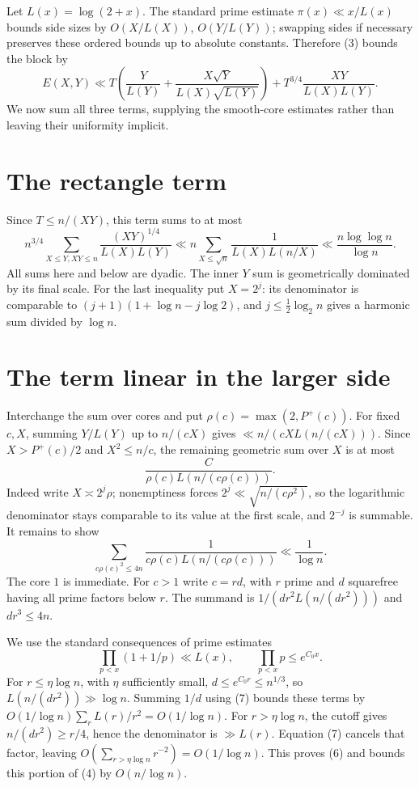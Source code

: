 \documentclass[11pt]{article}
\begin{document}
Let $L(x)=\log(2+x)$. The standard prime estimate $\pi(x)\ll x/L(x)$ bounds side sizes by $O(X/L(X))$, $O(Y/L(Y))$; swapping sides if necessary preserves these ordered bounds up to absolute constants. Therefore (3) bounds the block by
\[
 E(X,Y)\ll T\left(\frac Y{L(Y)}+\frac{X\sqrt Y}{L(X)\sqrt{L(Y)}}\right)
       +T^{3/4}\frac{XY}{L(X)L(Y)}.\tag{4}
\]
We now sum all three terms, supplying the smooth-core estimates rather than leaving their uniformity implicit.

\section*{The rectangle term}
Since $T\le n/(XY)$, this term sums to at most
\[
 n^{3/4}\sum_{X\le Y,XY\le n}\frac{(XY)^{1/4}}{L(X)L(Y)}
 \ll n\sum_{X\le\sqrt n}\frac1{L(X)L(n/X)}
 \ll\frac{n\log\log n}{\log n}.\tag{5}
\]
All sums here and below are dyadic. The inner $Y$ sum is geometrically dominated by its final scale. For the last inequality put $X=2^j$: its denominator is comparable to $(j+1)(1+\log n-j\log2)$, and $j\le\frac12\log_2n$ gives a harmonic sum divided by $\log n$.

\section*{The term linear in the larger side}
Interchange the sum over cores and put $\rho(c)=\max(2,P^+(c))$. For fixed $c,X$, summing $Y/L(Y)$ up to $n/(cX)$ gives $\ll n/(cXL(n/(cX)))$. Since $X>P^+(c)/2$ and $X^2\le n/c$, the remaining geometric sum over $X$ is at most
\[
 \frac{C}{\rho(c)L(n/(c\rho(c)))}.
\]
Indeed write $X\asymp2^j\rho$; nonemptiness forces $2^j\ll\sqrt{n/(c\rho^2)}$, so the logarithmic denominator stays comparable to its value at the first scale, and $2^{-j}$ is summable. It remains to show
\[
 \sum_{c\rho(c)^2\le4n}\frac1{c\rho(c)L(n/(c\rho(c)))}\ll\frac1{\log n}.\tag{6}
\]
The core $1$ is immediate. For $c>1$ write $c=rd$, with $r$ prime and $d$ squarefree having all prime factors below $r$. The summand is $1/(dr^2L(n/(dr^2)))$ and $dr^3\le4n$.

We use the standard consequences of prime estimates
\[
 \prod_{p<x}(1+1/p)\ll L(x),\qquad \prod_{p<x}p\le e^{C_0x}.\tag{7}
\]
For $r\le\eta\log n$, with $\eta$ sufficiently small, $d\le e^{C_0r}\le n^{1/3}$, so $L(n/(dr^2))\gg\log n$. Summing $1/d$ using (7) bounds these terms by $O(1/\log n)\sum_rL(r)/r^2=O(1/\log n)$. For $r>\eta\log n$, the cutoff gives $n/(dr^2)\ge r/4$, hence the denominator is $\gg L(r)$. Equation (7) cancels that factor, leaving $O(\sum_{r>\eta\log n}r^{-2})=O(1/\log n)$. This proves (6) and bounds this portion of (4) by $O(n/\log n)$.
\end{document}
